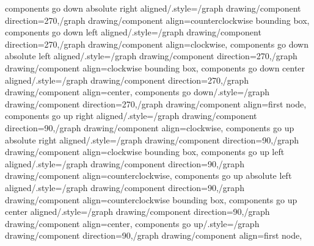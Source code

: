 {  components go down absolute right aligned/.style={/graph drawing/component direction=270,/graph drawing/component align=counterclockwise bounding box},
  components go down left aligned/.style={/graph drawing/component direction=270,/graph drawing/component align=clockwise},
  components go down absolute left aligned/.style={/graph drawing/component direction=270,/graph drawing/component align=clockwise bounding box},
  components go down center aligned/.style={/graph drawing/component direction=270,/graph drawing/component align=center},
  components go down/.style={/graph drawing/component direction=270,/graph drawing/component align=first node},
  components go up right aligned/.style={/graph drawing/component direction=90,/graph drawing/component align=clockwise},
  components go up absolute right aligned/.style={/graph drawing/component direction=90,/graph drawing/component align=clockwise bounding box},
  components go up left aligned/.style={/graph drawing/component direction=90,/graph drawing/component align=counterclockwise},
  components go up absolute left aligned/.style={/graph drawing/component direction=90,/graph drawing/component align=counterclockwise bounding box},
  components go up center aligned/.style={/graph drawing/component direction=90,/graph drawing/component align=center},
  components go up/.style={/graph drawing/component direction=90,/graph drawing/component align=first node},
}



% 
% 
% 
% 
% 
%


%




% 
% 




